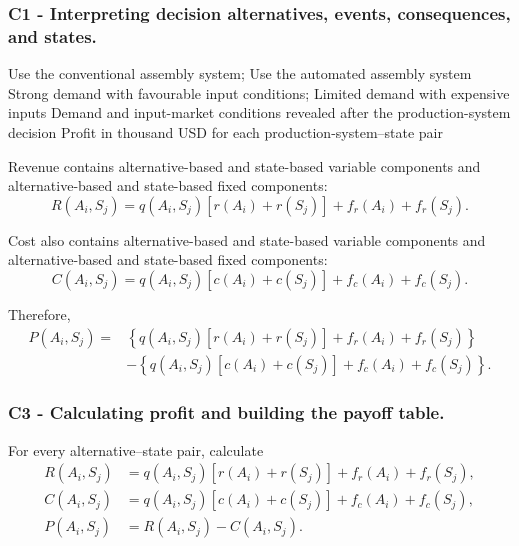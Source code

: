 \subsubsection*{C1 - Interpreting decision alternatives, events, consequences, and states.}
\label{subsec:problem19-smart-manufacturing-contract-c1}

\DecisionElementsTable
{Use the conventional assembly system; Use the automated assembly system}
{Strong demand with favourable input conditions; Limited demand with expensive inputs}
{Demand and input-market conditions revealed after the production-system decision}
{Profit in thousand USD for each production-system--state pair}

Revenue contains alternative-based and state-based variable components and
alternative-based and state-based fixed components:
\[
R(A_i,S_j)
=
q(A_i,S_j)
\left[
r(A_i)+r(S_j)
\right]
+
f_r(A_i)
+
f_r(S_j).
\]

Cost also contains alternative-based and state-based variable components and
alternative-based and state-based fixed components:
\[
C(A_i,S_j)
=
q(A_i,S_j)
\left[
c(A_i)+c(S_j)
\right]
+
f_c(A_i)
+
f_c(S_j).
\]

Therefore,
\[
\begin{aligned}
	P(A_i,S_j)
	={}&
	\left\{
	q(A_i,S_j)
	\left[
	r(A_i)+r(S_j)
	\right]
	+
	f_r(A_i)
	+
	f_r(S_j)
	\right\}
	\\
	&-
	\left\{
	q(A_i,S_j)
	\left[
	c(A_i)+c(S_j)
	\right]
	+
	f_c(A_i)
	+
	f_c(S_j)
	\right\}.
\end{aligned}
\]


\subsubsection*{C3 - Calculating profit and building the payoff table.}
\label{subsec:problem19-smart-manufacturing-contract-c3}

For every alternative--state pair, calculate
\[
\begin{aligned}
	R(A_i,S_j)
	&=
	q(A_i,S_j)
	\left[
	r(A_i)+r(S_j)
	\right]
	+
	f_r(A_i)
	+
	f_r(S_j),
	\\
	C(A_i,S_j)
	&=
	q(A_i,S_j)
	\left[
	c(A_i)+c(S_j)
	\right]
	+
	f_c(A_i)
	+
	f_c(S_j),
	\\
	P(A_i,S_j)
	&=
	R(A_i,S_j)-C(A_i,S_j).
\end{aligned}
\]

